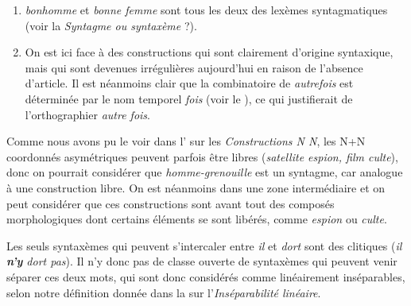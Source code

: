 {\begin{enumerate}
    \item \textit{bonhomme} et \textit{bonne femme} sont tous les deux des lexèmes syntagmatiques (voir la  \textit{Syntagme ou syntaxème} ?).

    \item On est ici face à des constructions qui sont clairement d’origine syntaxique, mais qui sont devenues irrégulières aujourd’hui en raison de l’absence d’article. Il est néanmoins clair que la combinatoire de \textit{autrefois} est déterminée par le nom temporel \textit{fois} (voir le ), ce qui justifierait de l’orthographier \textit{autre fois}.
    \end{enumerate}

     Comme nous avons pu le voir dans l' sur les \textit{Constructions N N}, les N+N coordonnés asymétriques peuvent parfois être libres (\textit{satellite espion, film culte}), donc on pourrait considérer que \textit{homme-grenouille} est un syntagme, car analogue à une construction libre. On est néanmoins dans une zone intermédiaire et on peut considérer que ces constructions sont avant tout des composés morphologiques dont certains éléments se sont libérés, comme \textit{espion} ou \textit{culte}.
    
     Les seuls syntaxèmes qui peuvent s’intercaler entre \textit{il} et \textit{dort} sont des clitiques (\textit{il \textbf{n’y} dort pas}). Il n’y donc pas de classe ouverte de syntaxèmes qui peuvent venir séparer ces deux mots, qui sont donc considérés comme linéairement inséparables, selon notre définition donnée dans la  sur l'\textit{Inséparabilité linéaire}.
}
